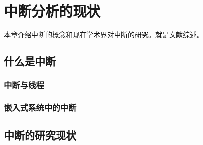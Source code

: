 
\chapter{中断分析的现状}
本章介绍中断的概念和现在学术界对中断的研究。就是文献综述。
\section{什么是中断}
\subsection{中断与线程}
\subsection{嵌入式系统中的中断}

\section{中断的研究现状}